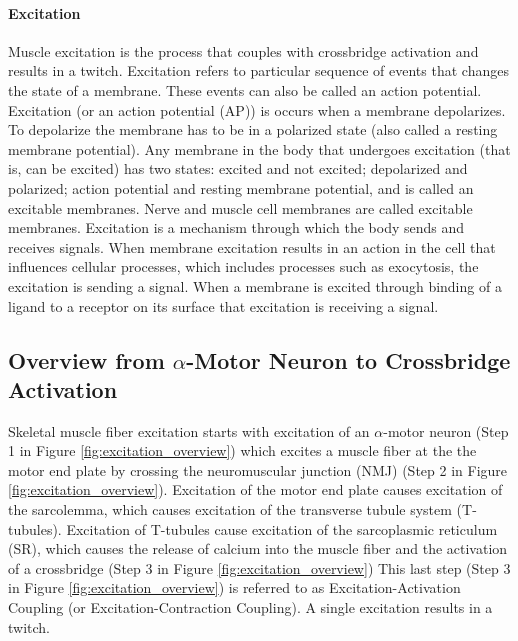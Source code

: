 \paragraph{Excitation}
Muscle excitation is the process that couples with crossbridge activation and results in a twitch. Excitation refers to particular sequence of events that changes the state of a membrane. These events can also be called an action potential. Excitation (or an action potential (AP)) is occurs when a membrane depolarizes. To depolarize the membrane has to be in a polarized state (also called a resting membrane potential). Any membrane in the body that undergoes excitation (that is, can be excited) has two states: excited and not excited; depolarized and polarized; action potential and resting membrane potential, and is called an excitable membranes. Nerve and muscle cell membranes are called excitable membranes. Excitation is a mechanism through which the body sends and receives signals. When membrane excitation results in an action in the cell that influences cellular processes, which includes processes such as exocytosis,\footnotemark{} the excitation is sending a signal. When a membrane is excited through binding of a ligand\footnotemark{} to a receptor on its surface that excitation is receiving a signal. 

\subsection{Overview from $\alpha$-Motor Neuron to Crossbridge Activation}

Skeletal muscle fiber excitation starts with excitation of an $\alpha$-motor neuron (Step 1 in Figure \ref{fig:excitation_overview}) which excites a muscle fiber at the the motor end plate by crossing the neuromuscular junction (NMJ) (Step 2 in Figure \ref{fig:excitation_overview}). Excitation of the motor end plate causes excitation of the sarcolemma, which causes excitation of the transverse tubule system (T-tubules). Excitation of T-tubules cause excitation of the sarcoplasmic reticulum (SR), which causes the release of calcium into the muscle fiber and the activation of a crossbridge (Step 3 in Figure \ref{fig:excitation_overview}) This last step (Step 3 in Figure \ref{fig:excitation_overview}) is referred to as Excitation-Activation Coupling (or Excitation-Contraction Coupling). A single excitation results in a twitch.

